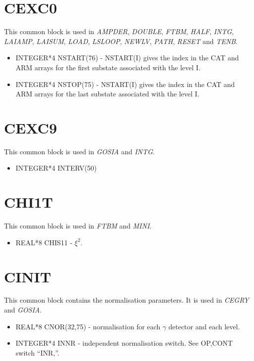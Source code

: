 \section{CEXC0}

This common block is used in {\em AMPDER}, {\em DOUBLE}, {\em FTBM}, {\em
HALF}, {\em INTG}, {\em LAIAMP}, {\em LAISUM}, {\em LOAD}, {\em LSLOOP},
{\em NEWLV}, {\em PATH}, {\em RESET} and {\em TENB}.

\begin{itemize}
\item INTEGER*4 NSTART(76) - NSTART(I) gives the index in the CAT and ARM
arrays for the first substate associated with the level I.
\item INTEGER*4 NSTOP(75) - NSTART(I) gives the index in the CAT and ARM
arrays for the last substate associated with the level I.
\end{itemize}

\section{CEXC9}

This common block is used in {\em GOSIA} and {\em INTG}.

\begin{itemize}
\item INTEGER*4 INTERV(50)
\end{itemize}

\section{CHI1T}

This common block is used in {\em FTBM} and {\em MINI}.

\begin{itemize}
\item REAL*8 CHIS11 - $\xi^2$.
\end{itemize}

\section{CINIT}

This common block contains the normalisation parameters. It is used in {\em
CEGRY} and {\em GOSIA}.

\begin{itemize}
\item REAL*8 CNOR(32,75) - normalisation for each $\gamma$ detector and each
level.
\item INTEGER*4 INNR - independent normalisation switch. See OP,CONT switch
``INR,''.
\end{itemize}

